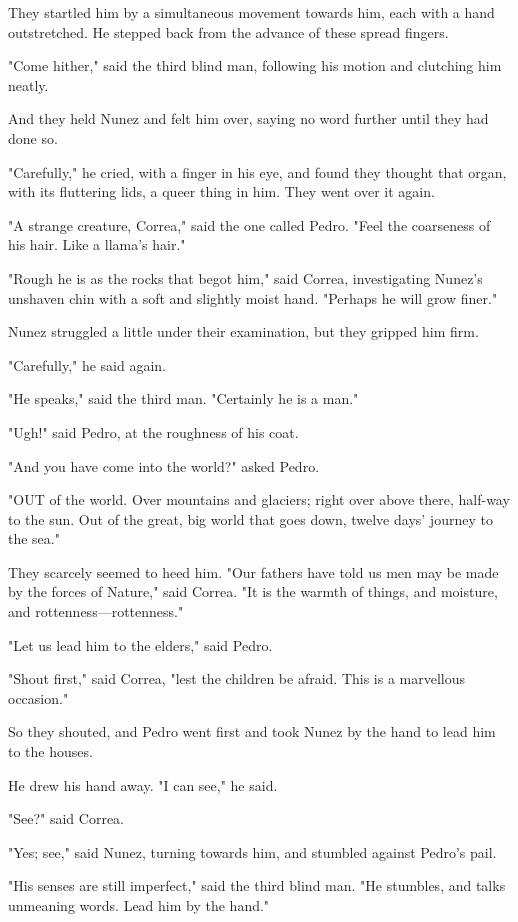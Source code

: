 \documentclass[submission]{sffms}
\begin{document}
They startled him by a simultaneous movement towards him, each with a
hand outstretched. He stepped back from the advance of these spread
fingers.

"Come hither," said the third blind man, following his motion and
clutching him neatly.

And they held Nunez and felt him over, saying no word further until
they had done so.

"Carefully," he cried, with a finger in his eye, and found they
thought that organ, with its fluttering lids, a queer thing in
him. They went over it again.

"A strange creature, Correa," said the one called Pedro. "Feel the
coarseness of his hair. Like a llama's hair."

"Rough he is as the rocks that begot him," said Correa, investigating
Nunez's unshaven chin with a soft and slightly moist hand. "Perhaps he
will grow finer."

Nunez struggled a little under their examination, but they gripped him
firm.

"Carefully," he said again.

"He speaks," said the third man. "Certainly he is a man."

"Ugh!" said Pedro, at the roughness of his coat.

"And you have come into the world?" asked Pedro.

"OUT of the world. Over mountains and glaciers; right over above
there, half-way to the sun. Out of the great, big world that goes
down, twelve days' journey to the sea."

They scarcely seemed to heed him. "Our fathers have told us men may be
made by the forces of Nature," said Correa. "It is the warmth of
things, and moisture, and rottenness---rottenness."

"Let us lead him to the elders," said Pedro.

"Shout first," said Correa, "lest the children be afraid. This is a
marvellous occasion."

So they shouted, and Pedro went first and took Nunez by the hand to
lead him to the houses.

He drew his hand away. "I can see," he said.

"See?" said Correa.

"Yes; see," said Nunez, turning towards him, and stumbled against
Pedro's pail.

"His senses are still imperfect," said the third blind man. "He
stumbles, and talks unmeaning words. Lead him by the hand."
\end{document}
